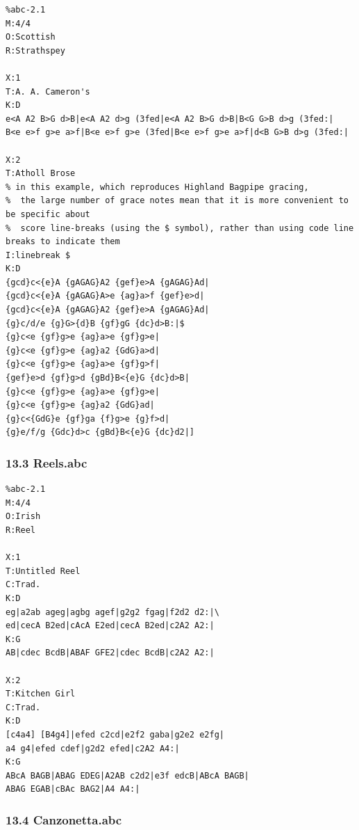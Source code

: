 \documentclass[oneside]{book}
\begin{document}
\begin{verbatim}
%abc-2.1
M:4/4
O:Scottish
R:Strathspey

X:1
T:A. A. Cameron's
K:D
e<A A2 B>G d>B|e<A A2 d>g (3fed|e<A A2 B>G d>B|B<G G>B d>g (3fed:|
B<e e>f g>e a>f|B<e e>f g>e (3fed|B<e e>f g>e a>f|d<B G>B d>g (3fed:|

X:2
T:Atholl Brose
% in this example, which reproduces Highland Bagpipe gracing,
%  the large number of grace notes mean that it is more convenient to be specific about
%  score line-breaks (using the $ symbol), rather than using code line breaks to indicate them
I:linebreak $
K:D
{gcd}c<{e}A {gAGAG}A2 {gef}e>A {gAGAG}Ad|
{gcd}c<{e}A {gAGAG}A>e {ag}a>f {gef}e>d|
{gcd}c<{e}A {gAGAG}A2 {gef}e>A {gAGAG}Ad|
{g}c/d/e {g}G>{d}B {gf}gG {dc}d>B:|$
{g}c<e {gf}g>e {ag}a>e {gf}g>e|
{g}c<e {gf}g>e {ag}a2 {GdG}a>d|
{g}c<e {gf}g>e {ag}a>e {gf}g>f|
{gef}e>d {gf}g>d {gBd}B<{e}G {dc}d>B|
{g}c<e {gf}g>e {ag}a>e {gf}g>e|
{g}c<e {gf}g>e {ag}a2 {GdG}ad|
{g}c<{GdG}e {gf}ga {f}g>e {g}f>d|
{g}e/f/g {Gdc}d>c {gBd}B<{e}G {dc}d2|]
\end{verbatim}

\hypertarget{reelsabc}{\subsubsection{13.3 Reels.abc}\label{reelsabc}}

\begin{verbatim}
%abc-2.1
M:4/4
O:Irish
R:Reel

X:1
T:Untitled Reel
C:Trad.
K:D
eg|a2ab ageg|agbg agef|g2g2 fgag|f2d2 d2:|\
ed|cecA B2ed|cAcA E2ed|cecA B2ed|c2A2 A2:|
K:G
AB|cdec BcdB|ABAF GFE2|cdec BcdB|c2A2 A2:|

X:2
T:Kitchen Girl
C:Trad.
K:D
[c4a4] [B4g4]|efed c2cd|e2f2 gaba|g2e2 e2fg|
a4 g4|efed cdef|g2d2 efed|c2A2 A4:|
K:G
ABcA BAGB|ABAG EDEG|A2AB c2d2|e3f edcB|ABcA BAGB|
ABAG EGAB|cBAc BAG2|A4 A4:|
\end{verbatim}

\hypertarget{canzonettaabc}{\subsubsection{13.4
Canzonetta.abc}\label{canzonettaabc}}
\end{document}
